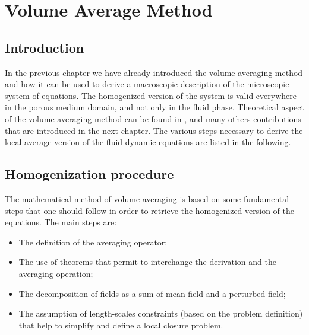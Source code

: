 \chapter{Volume Average Method}
\label{ch:vans}


\section{Introduction}

In the previous chapter we have already introduced the volume averaging method and how it can be used to derive a macroscopic description of the microscopic system of equations.
The homogenized version of the system is valid everywhere in the porous medium domain, and not only in the fluid phase.
Theoretical aspect of the volume averaging method can be found in \citet{whitaker2013method} \cite{whitaker1986flow} \cite{whitaker1996forchheimer}, \citet{quintard1994transport1} \cite{quintard1994transport2} \cite{quintard1994transport3} \cite{quintard1994transport4} \cite{quintard1994transport5} and many others contributions that are introduced in the next chapter.
The various steps necessary to derive the local average version of the fluid dynamic equations are listed in the following.

\section{Homogenization procedure}
The mathematical method of volume averaging is based on some fundamental steps that one should follow in order to retrieve the homogenized version of the equations.
The main steps are:
\begin{itemize}
\item The definition of the averaging operator;
\item The use of theorems that permit to interchange the derivation and the averaging operation;
\item The decomposition of fields as a sum of mean field and a perturbed field;
\item The assumption of length-scales constraints (based on the problem definition) that help to simplify and define a local closure  problem.
\end{itemize}

